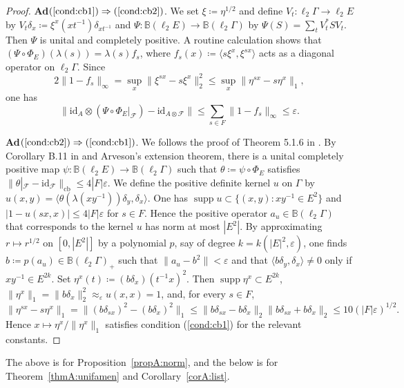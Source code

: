 \documentclass[12pt,nosumlimits,nonamelimits]{amsart}
\theoremstyle{remark}
\theoremstyle{definition}
\newcommand{\IB}{\mathbb{B}}
\newcommand{\cF}{\mathcal{F}}
\newcommand{\ve}{\varepsilon}
\newcommand{\Ga}{\Gamma}
\newcommand{\id}{\mathrm{id}}
\DeclareMathOperator{\cb}{cb}
\DeclareMathOperator{\supp}{supp}
\newcommand{\ip}[1]{\mathopen{\langle}#1\mathclose{\rangle}}
\begin{document}
\begin{proof}
\textbf{Ad}$(\ref{cond:cb1})\Rightarrow(\ref{cond:cb2})$.
We set $\xi\coloneq\eta^{1/2}$ and 
define $V_t\colon\ell_2\Ga \to \ell_2E$ 
by $V_t\delta_x \coloneq \xi^x(xt^{-1})\delta_{xt^{-1}}$ 
and $\Psi\colon\IB(\ell_2E)\to\IB(\ell_2\Ga)$ by 
$\Psi(S)=\sum_t V_t^*SV_t$. 
Then $\Psi$ is unital and completely positive.
A routine calculation shows that 
$(\Psi\circ\Phi_E)(\lambda(s)) = \lambda(s)f_s$, 
where $f_s(x) \coloneq \ip{ s\xi^x, \xi^{sx}}$ 
acts as a diagonal operator on $\ell_2\Ga$. 
Since 
\[
2\|1-f_s\|_\infty = \sup_x\| \xi^{sx} - s\xi^x \|_2^2
 \le \sup_x \| \eta^{sx} - s\eta^x \|_1,
\]
one has 
\[
\|\id_A\otimes (\Psi\circ\Phi_E|_\cF)
  - \id_{A\otimes\cF}\|
 \le\sum_{s\in F}\| 1 - f_s \|_\infty \le \ve.
\]

\textbf{Ad}$(\ref{cond:cb2})\Rightarrow(\ref{cond:cb1})$. 
We follows the proof of Theorem 5.1.6 in \cite{bo}. 
By Corollary B.11 in \cite{bo} 
and Arveson's extension theorem, 
there is a unital completely positive map 
$\psi\colon\IB(\ell_2 E)\to\IB(\ell_2\Ga)$ 
such that $\theta\coloneq \psi\circ\Phi_E$ satisfies 
$\|\theta|_{\cF} - \id_{\cF} \|_{\cb}\le 4|F|\ve$.
We define the positive definite kernel 
$u$ on $\Ga$ by 
$u(x,y)=\ip{\theta(\lambda(xy^{-1}))\delta_y,\delta_x}$. 
One has $\supp u\subset\{(x,y) : xy^{-1}\in E^2\}$ and 
$| 1 - u(sx,x) | \le 4|F|\ve$ for $s\in F$. 
Hence the positive operator $a_u \in \IB(\ell_2\Ga)$ 
that corresponds to the kernel $u$ has norm 
at most $|E^2|$. 
By approximating $r\mapsto r^{1/2}$ on $[0,|E^2|]$ by 
a polynomial $p$, say of degree $k = k(|E|^2,\ve)$, 
one finds $b \coloneq p(a_u) \in \IB(\ell_2\Ga)_+$ 
such that $\|a_u - b^2 \|<\ve$ and that 
$\ip{b\delta_y,\delta_x}\neq0$ only if 
$xy^{-1} \in E^{2k}$.
Set $\eta^x(t) \coloneq (b\delta_x)(t^{-1}x)^2$. 
Then $\supp\eta^x\subset E^{2k}$,
$\|\eta^x\|_1=\|b\delta_x\|_2^2 \approx_\ve u(x,x)=1$, 
and, for every $s\in F$, 
\[
\|\eta^{sx} - s\eta^x\|_1
 = \| (b\delta_{sx})^2 - (b\delta_x)^2\|_1
 \le \| b\delta_{sx} - b\delta_x\|_2 \| b\delta_{sx} + b\delta_x\|_2
 \le 10(|F|\ve)^{1/2}.
\]
Hence $x\mapsto\eta^x/\|\eta^x\|_1$ satisfies condition (\ref{cond:cb1}) 
for the relevant constants. 
\end{proof}

The above is for Proposition~\ref{propA:norm}, 
and the below is for Theorem~\ref{thmA:unifamen} and Corollary~\ref{corA:list}.
\end{document}
